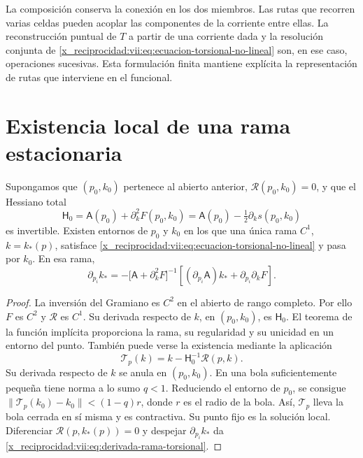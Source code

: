 La composición conserva la conexión en los dos miembros. Las rutas
que recorren varias celdas pueden acoplar las componentes de la
corriente entre ellas. La reconstrucción puntual de \(T\) a partir
de una corriente dada y la resolución conjunta de
\eqref{x_reciprocidad:vii:eq:ecuacion-torsional-no-lineal} son, en ese caso,
operaciones sucesivas. Esta formulación finita mantiene explícita
la representación de rutas que interviene en el funcional.

\section{Existencia local de una rama estacionaria}
\label{x_reciprocidad:vii:subsec:rama-torsional-local}

\begin{theorem}
\label{x_reciprocidad:vii:thm:rama-torsional-local}
Supongamos que \((p_0,k_0)\) pertenece al abierto anterior,
\(\mathcal R(p_0,k_0)=0\), y que el Hessiano total
\begin{equation}
 \mathsf H_0
 =\mathsf A(p_0)+\partial_k^2F(p_0,k_0)
 =\mathsf A(p_0)-\tfrac12\partial_ks(p_0,k_0)
 \label{x_reciprocidad:vii:eq:hessiano-total-torsional}
\end{equation}
es invertible. Existen entornos de \(p_0\) y \(k_0\) en los que
una única rama \(C^1\), \(k=k_*(p)\), satisface
\eqref{x_reciprocidad:vii:eq:ecuacion-torsional-no-lineal} y pasa por \(k_0\).
En esa rama,
\begin{equation}
 \partial_{p_i}k_*
 =-\bigl[\mathsf A+\partial_k^2F\bigr]^{-1}
     \left[(\partial_{p_i}\mathsf A)k_*
                      +\partial_{p_i}\partial_kF\right].
 \label{x_reciprocidad:vii:eq:derivada-rama-torsional}
\end{equation}
\end{theorem}

\begin{proof}
La inversión del Gramiano es \(C^2\) en el abierto de rango
completo. Por ello \(F\) es \(C^2\) y \(\mathcal R\) es
\(C^1\). Su derivada respecto de \(k\), en \((p_0,k_0)\), es
\(\mathsf H_0\). El teorema de la función implícita proporciona
la rama, su regularidad y su unicidad en un entorno del punto.
También puede verse la existencia mediante la aplicación
\[
 \mathcal T_p(k)=k-\mathsf H_0^{-1}\mathcal R(p,k).
\]
Su derivada respecto de \(k\) se anula en \((p_0,k_0)\).
En una bola suficientemente pequeña tiene norma a lo sumo
\(q<1\). Reduciendo el entorno de \(p_0\), se consigue
\(\|\mathcal T_p(k_0)-k_0\|<(1-q)r\), donde \(r\) es el
radio de la bola. Así, \(\mathcal T_p\) lleva la bola cerrada
en sí misma y es contractiva. Su punto fijo es la solución local.
Diferenciar \(\mathcal R(p,k_*(p))=0\) y despejar
\(\partial_{p_i}k_*\) da
\eqref{x_reciprocidad:vii:eq:derivada-rama-torsional}.
\end{proof}

